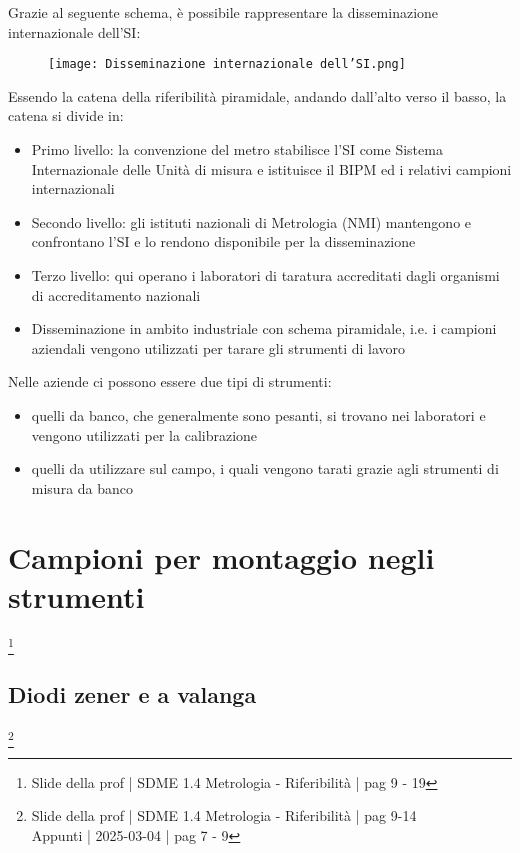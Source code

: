 Grazie al seguente schema, è possibile rappresentare la disseminazione internazionale dell'SI: 

\begin{figure}[h]
    \centering
    \texttt{[image: Disseminazione internazionale dell'SI.png]}
\end{figure}

Essendo la catena della riferibilità piramidale, 
andando dall'alto verso il basso, la catena si divide in: 

\begin{itemize}
    \item Primo livello: la convenzione del metro stabilisce l'SI come Sistema Internazionale delle Unità di misura e istituisce il BIPM ed i relativi campioni internazionali 
    \item Secondo livello: gli istituti nazionali di Metrologia (NMI) mantengono e confrontano l'SI e lo rendono disponibile per la disseminazione 
    \item Terzo livello: qui operano i laboratori di taratura accreditati dagli organismi di accreditamento nazionali
    \item Disseminazione in ambito industriale con schema piramidale, i.e. i campioni aziendali vengono utilizzati per tarare gli strumenti di lavoro 
\end{itemize}

Nelle aziende ci possono essere due tipi di strumenti: 

\begin{itemize}
    \item quelli da banco, che generalmente sono pesanti, si trovano nei laboratori e vengono utilizzati per la calibrazione 
    \item quelli da utilizzare sul campo, i quali vengono tarati grazie agli strumenti di misura da banco
\end{itemize}

\newpage 

\section{Campioni per montaggio negli strumenti}
\footnote{Slide della prof | SDME 1.4 Metrologia - Riferibilità | pag 9 - 19}

\subsection{Diodi zener e a valanga}
\footnote{Slide della prof | SDME 1.4 Metrologia - Riferibilità | pag 9-14 \\  
Appunti | 2025-03-04 | pag 7 - 9}

